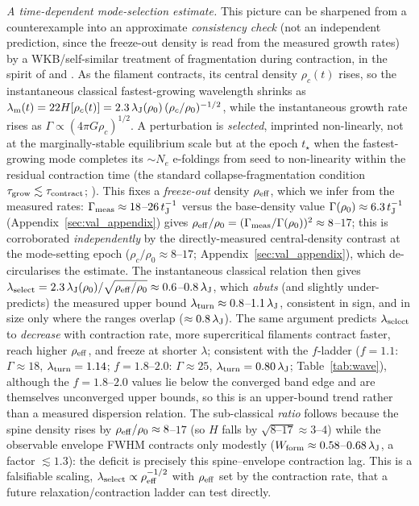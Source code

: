 \documentclass[usenatbib,twoside,twocolumn]{mnras}
\begin{document}
\emph{A time-dependent mode-selection estimate.} This picture can be sharpened from a counterexample into an approximate \emph{consistency check} (not an independent prediction, since the freeze-out density is read from the measured growth rates) by a WKB/self-similar treatment of fragmentation during contraction, in the spirit of \citet{Larson1985} and \citet{Clarke2016,Clarke2017}. As the filament contracts, its central density $\rho_c(t)$ rises, so the instantaneous classical fastest-growing wavelength shrinks as $\lambda_{\rm m}(t)=22H[\rho_c(t)]=2.3\,\lambda_{\rm J}(\rho_0)\,(\rho_c/\rho_0)^{-1/2}$, while the instantaneous growth rate rises as $\Gamma\propto(4\pi G\rho_c)^{1/2}$. A perturbation is \emph{selected}, imprinted non-linearly, not at the marginally-stable equilibrium scale but at the epoch $t_\star$ when the fastest-growing mode completes its $\sim\!N_e$ e-foldings from seed to non-linearity within the residual contraction time (the standard collapse-fragmentation condition $\tau_{\rm grow}\lesssim\tau_{\rm contract}$; \citealt{Larson1985}). This fixes a \emph{freeze-out} density $\rho_{\rm eff}$, which we infer from the measured rates: $\Gamma_{\rm meas}\approx18$--$26\,t_{\rm J}^{-1}$ versus the base-density value $\Gamma(\rho_0)\approx6.3\,t_{\rm J}^{-1}$ (Appendix~\ref{sec:val_appendix}) gives $\rho_{\rm eff}/\rho_0=(\Gamma_{\rm meas}/\Gamma(\rho_0))^2\approx8$--$17$; this is corroborated \emph{independently} by the directly-measured central-density contrast at the mode-setting epoch ($\rho_c/\rho_0\approx8$--$17$; Appendix~\ref{sec:val_appendix}), which de-circularises the estimate. The instantaneous classical relation then gives $\lambda_{\rm select}=2.3\,\lambda_{\rm J}(\rho_0)/\sqrt{\rho_{\rm eff}/\rho_0}\approx0.6$--$0.8\,\lambda_{\rm J}$, which \emph{abuts} (and slightly under-predicts) the measured upper bound $\lambda_{\rm turn}\approx0.8$--$1.1\,\lambda_{\rm J}$, consistent in sign, and in size only where the ranges overlap ($\approx0.8\,\lambda_{\rm J}$). The same argument predicts $\lambda_{\rm select}$ to \emph{decrease} with contraction rate, more supercritical filaments contract faster, reach higher $\rho_{\rm eff}$, and freeze at shorter $\lambda$; consistent with the $f$-ladder ($f=1.1$: $\Gamma\approx18$, $\lambda_{\rm turn}=1.14$; $f=1.8$--$2.0$: $\Gamma\approx25$, $\lambda_{\rm turn}=0.80\,\lambda_{\rm J}$; Table~\ref{tab:wave}), although the $f=1.8$--$2.0$ values lie below the converged band edge and are themselves unconverged upper bounds, so this is an upper-bound trend rather than a measured dispersion relation. The sub-classical \emph{ratio} follows because the spine density rises by $\rho_{\rm eff}/\rho_0\approx8$--$17$ (so $H$ falls by $\sqrt{8\text{--}17}\approx3$--$4$) while the observable envelope FWHM contracts only modestly ($W_{\rm form}\approx0.58$--$0.68\,\lambda_{\rm J}$, a factor $\lesssim1.3$): the deficit is precisely this spine--envelope contraction lag. This is a falsifiable scaling, $\lambda_{\rm select}\propto\rho_{\rm eff}^{-1/2}$ with $\rho_{\rm eff}$ set by the contraction rate, that a future relaxation/contraction ladder can test directly.
\end{document}
